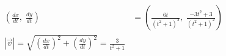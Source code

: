 \documentclass[preview]{standalone}
\begin{document}
\begin{align*}
\left(\frac{dx}{dt}, \; \frac{dy}{dt}\right) &= \left(\frac{6t}{(t^2 +1)^2}, \; \frac{-3t^2 + 3}{(t^2 + 1)^2}\right) \\ |\vec{v}| = \sqrt{\left(\frac{dx}{dt}\right)^2 + \left(\frac{dy}{dt}\right)^2} =  \frac{3}{t^2 + 1 }
\end{align*}
\end{document}
